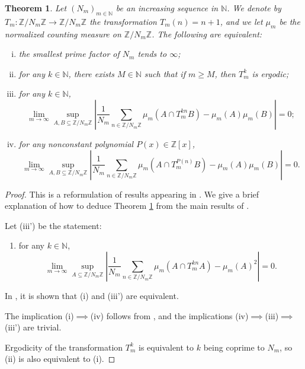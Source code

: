 \documentclass{amsart}
\newtheorem{theorem}{Theorem}[section]
\theoremstyle{definition}
\numberwithin{equation}{section}
\newcommand{\N}{\mathbb{N}}
\newcommand{\Z}{\mathbb{Z}}
\begin{document}
\begin{theorem} \label{thm: bb}
    Let $(N_m)_{m \in \N}$ be an increasing sequence in $\N$.
    We denote by $T_m : \Z/N_m\Z \to \Z/N_m\Z$ the transformation $T_m(n) = n + 1$, and we let $\mu_m$ be the normalized counting measure on $\Z/N_m\Z$.
    The following are equivalent:
    \begin{enumerate}[(i)]
        \item the smallest prime factor of $N_m$ tends to $\infty$;
        \item for any $k \in \N$, there exists $M \in \N$ such that if $m \ge M$, then $T_m^k$ is ergodic;
        \item for any $k \in \N$,
            \begin{equation*}
                \lim_{m \to \infty} \sup_{A, B \subseteq \Z/N_m\Z} \left| \frac{1}{N_m} \sum_{n \in \Z/N_m\Z} \mu_m(A \cap T_m^{kn}B) - \mu_m(A) \mu_m(B)\right| = 0;
            \end{equation*}
        \item for any nonconstant polynomial $P(x) \in \Z[x]$,
            \begin{equation*}
                \lim_{m \to \infty} \sup_{A,B \subseteq \Z/N_m\Z} \left| \frac{1}{N_m} \sum_{n \in \Z/N_m\Z} \mu_m(A \cap T_m^{P(n)}B) - \mu_m(A) \mu_m(B)\right| = 0.
            \end{equation*}
    \end{enumerate}
\end{theorem}

\begin{proof}
    This is a reformulation of results appearing in \cite{bb1}.
    We give a brief explanation of how to deduce Theorem \ref{thm: bb} from the main results of \cite{bb1}.
    
    Let (iii') be the statement:
    \begin{enumerate}
        \item[(iii')] for any $k \in \N$,
            \begin{equation*}
                \lim_{m \to \infty} \sup_{A \subseteq \Z/N_m\Z} \left| \frac{1}{N_m} \sum_{n \in \Z/N_m\Z} \mu_m(A \cap T_m^{kn}A) - \mu_m(A)^2\right| = 0.
            \end{equation*}
    \end{enumerate}
    In \cite[Proposition 1.3]{bb1}, it is shown that (i) and (iii') are equivalent.

    The implication (i)$\implies$(iv) follows from \cite[Theorem 2.6]{bb1}, and the implications (iv)$\implies$(iii)$\implies$(iii') are trivial.

    Ergodicity of the transformation $T^k_m$ is equivalent to $k$ being coprime to $N_m$, so (ii) is also equivalent to (i).
\end{proof}
\end{document}
